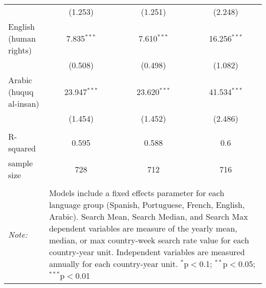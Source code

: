 \begin{table}[!htbp]
\begin{tabular}{@{\extracolsep{5pt}}lccc}
  & (1.253) & (1.251) & (2.248) \\ 
  English (human rights) & 7.835$^{***}$ & 7.610$^{***}$ & 16.256$^{***}$ \\ 
  & (0.508) & (0.498) & (1.082) \\ 
  Arabic (huquq al-insan) & 23.947$^{***}$ & 23.620$^{***}$ & 41.534$^{***}$ \\ 
  & (1.454) & (1.452) & (2.486) \\ 
 \hline \\[-1.8ex] 
R-squared  & 0.595 & 0.588 & 0.6 \\ 
sample size  & 728 & 712 & 716 \\ 
\hline 
\hline \\[-1.8ex] 
\textit{Note:}  & \multicolumn{3}{l}{\parbox[t]{8cm}{Models include a fixed effects parameter for each language group (Spanish, Portuguese, French, English, Arabic). Search Mean, Search Median, and Search Max dependent variables are measure of the yearly mean, median, or max country-week search rate value for each country-year unit. Independent variables are measured annually for each country-year unit. $^{*}$p$<$0.1; $^{**}$p$<$0.05; $^{***}$p$<$0.01}} \\ 
\end{tabular} 
\end{table} 
